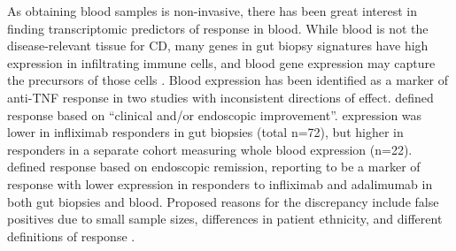 As obtaining blood samples is non-invasive, there has been great interest in finding transcriptomic predictors of response in blood.
%
While blood is not the disease-relevant tissue for \gls{CD},
many genes in gut biopsy signatures have high expression in infiltrating immune cells, and blood gene expression may capture the precursors of those cells \autocite{gaujoux2019CellcentredMetaanalysisReveals}.
Blood  expression has been identified as a marker of anti-\gls{TNF} response in two studies with inconsistent directions of effect.
\textcite{gaujoux2019CellcentredMetaanalysisReveals} defined response based on  
\enquote{clinical and/or endoscopic improvement}.
 expression was lower in infliximab responders in gut biopsies (total n=72),
but higher in responders in a separate cohort measuring whole blood expression (n=22).
\textcite{verstockt2019LowTREM1Expression} defined response based on endoscopic remission, reporting  to be a marker of response 
with lower expression in responders to infliximab and adalimumab in both gut biopsies and blood.
Proposed reasons for the discrepancy include false positives due to small sample sizes, differences in patient ethnicity, and different definitions of response \autocite{verstockt2019TREM1IdealPredictive,digby-bell2019InterrogatingHostImmunity}.

